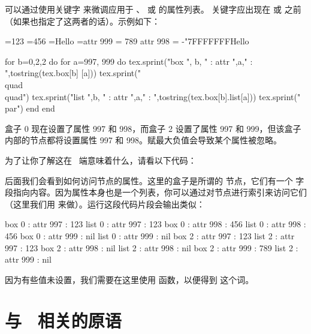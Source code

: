 可以通过使用关键字  来微调应用于 、 或  的属性列表。 关键字应出现在  或  之前（如果也指定了这两者的话）。示例如下：

\begin{typing}
=123
=456
=\hbox {Hello}
=\hbox attr 999 = 789 attr 998 = -"7FFFFFFF{Hello}
\end{typing}

\begin{typing}
  for b=0,2,2 do
    for a=997, 999 do
      tex.sprint("box ", b, " : attr ",a," : ",tostring(tex.box[b]     [a]))
      tex.sprint("\\quad\\quad")
      tex.sprint("list ",b, " : attr ",a," : ",tostring(tex.box[b].list[a]))
      tex.sprint("\\par")
    end
  end
\end{typing}



盒子 0 现在设置了属性 997 和 998，而盒子 2 设置了属性 997 和 999，但该盒子内部的节点都将设置属性 997 和 998。赋最大负值会导致某个属性被忽略。

为了让你了解这在 \LUA\ 端意味着什么，请看以下代码：



后面我们会看到如何访问节点的属性。这里的盒子是所谓的  节点，它们有一个  字段指向内容。因为属性本身也是一个列表，你可以通过对节点进行索引来访问它们（这里我们用 \type {[a]} 来做）。运行这段代码片段会输出类似：

\begin{typing}
box 0 : attr 997 : 123    list 0 : attr 997 : 123
box 0 : attr 998 : 456    list 0 : attr 998 : 456
box 0 : attr 999 : nil    list 0 : attr 999 : nil
box 2 : attr 997 : 123    list 2 : attr 997 : 123
box 2 : attr 998 : nil    list 2 : attr 998 : nil
box 2 : attr 999 : 789    list 2 : attr 999 : nil
\end{typing}

因为有些值未设置，我们需要在这里使用  函数，以便得到  这个词。

\section{与 \LUA\ 相关的原语}

\subsection{}

